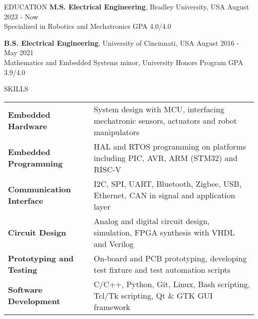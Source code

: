 \documentclass{lib/resume} %
\begin{document}

\begin{rSection}{EDUCATION}
    {\bf M.S. Electrical Engineering}, Bradley University, USA \hfill {August 2023 - Now} \\
    Specialized in Robotics and Mechatronics \hfill GPA 4.0/4.0 \smallskip

    {\bf B.S. Electrical Engineering}, University of Cincinnati, USA \hfill {August 2016 - May 2021}\\
    Mathematics and Embedded Systems minor, University Honors Program \hfill {GPA 3.9/4.0}



\end{rSection}

\begin{rSection}{SKILLS}

    \begin{tabular}{ @{} >{\bfseries}l @{\hspace{2ex}} l }
        Embedded Hardware       & System design with MCU, interfacing mechatronic sensors, actuators and robot manipulators \\
        Embedded Programming    & HAL and RTOS programming on platforms including PIC, AVR, ARM (STM32) and RISC-V  \\
        Communication Interface & I2C, SPI, UART, Bluetooth, Zigbee, USB, Ethernet, CAN in signal and application layer \\
        Circuit Design          & Analog and digital circuit design, simulation, FPGA synthesis with VHDL and Verilog  \\
        Prototyping and Testing & On-board and PCB prototyping, developing test
        fixture and test automation scripts \\
        Software Development    & C/C++, Python, Git, Linux, Bash scripting, Tcl/Tk scripting, Qt \& GTK GUI framework \\
    \end{tabular}
\end{rSection}
\end{document}
